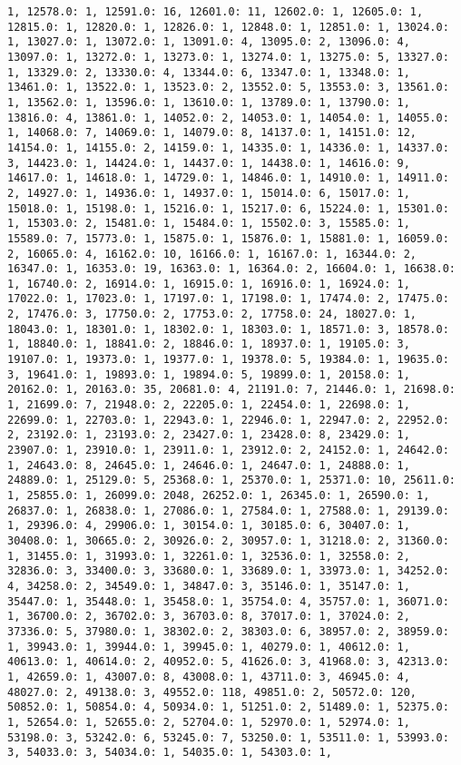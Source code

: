 \documentclass[11pt]{article}
\begin{document}
\begin{Verbatim}[commandchars=\\\{\}]
1, 12578.0: 1, 12591.0: 16, 12601.0: 11, 12602.0: 1, 12605.0: 1, 12815.0: 1, 12820.0: 1, 12826.0: 1, 12848.0: 1, 12851.0: 1, 13024.0: 1, 13027.0: 1, 13072.0: 1, 13091.0: 4, 13095.0: 2, 13096.0: 4, 13097.0: 1, 13272.0: 1, 13273.0: 1, 13274.0: 1, 13275.0: 5, 13327.0: 1, 13329.0: 2, 13330.0: 4, 13344.0: 6, 13347.0: 1, 13348.0: 1, 13461.0: 1, 13522.0: 1, 13523.0: 2, 13552.0: 5, 13553.0: 3, 13561.0: 1, 13562.0: 1, 13596.0: 1, 13610.0: 1, 13789.0: 1, 13790.0: 1, 13816.0: 4, 13861.0: 1, 14052.0: 2, 14053.0: 1, 14054.0: 1, 14055.0: 1, 14068.0: 7, 14069.0: 1, 14079.0: 8, 14137.0: 1, 14151.0: 12, 14154.0: 1, 14155.0: 2, 14159.0: 1, 14335.0: 1, 14336.0: 1, 14337.0: 3, 14423.0: 1, 14424.0: 1, 14437.0: 1, 14438.0: 1, 14616.0: 9, 14617.0: 1, 14618.0: 1, 14729.0: 1, 14846.0: 1, 14910.0: 1, 14911.0: 2, 14927.0: 1, 14936.0: 1, 14937.0: 1, 15014.0: 6, 15017.0: 1, 15018.0: 1, 15198.0: 1, 15216.0: 1, 15217.0: 6, 15224.0: 1, 15301.0: 1, 15303.0: 2, 15481.0: 1, 15484.0: 1, 15502.0: 3, 15585.0: 1, 15589.0: 7, 15773.0: 1, 15875.0: 1, 15876.0: 1, 15881.0: 1, 16059.0: 2, 16065.0: 4, 16162.0: 10, 16166.0: 1, 16167.0: 1, 16344.0: 2, 16347.0: 1, 16353.0: 19, 16363.0: 1, 16364.0: 2, 16604.0: 1, 16638.0: 1, 16740.0: 2, 16914.0: 1, 16915.0: 1, 16916.0: 1, 16924.0: 1, 17022.0: 1, 17023.0: 1, 17197.0: 1, 17198.0: 1, 17474.0: 2, 17475.0: 2, 17476.0: 3, 17750.0: 2, 17753.0: 2, 17758.0: 24, 18027.0: 1, 18043.0: 1, 18301.0: 1, 18302.0: 1, 18303.0: 1, 18571.0: 3, 18578.0: 1, 18840.0: 1, 18841.0: 2, 18846.0: 1, 18937.0: 1, 19105.0: 3, 19107.0: 1, 19373.0: 1, 19377.0: 1, 19378.0: 5, 19384.0: 1, 19635.0: 3, 19641.0: 1, 19893.0: 1, 19894.0: 5, 19899.0: 1, 20158.0: 1, 20162.0: 1, 20163.0: 35, 20681.0: 4, 21191.0: 7, 21446.0: 1, 21698.0: 1, 21699.0: 7, 21948.0: 2, 22205.0: 1, 22454.0: 1, 22698.0: 1, 22699.0: 1, 22703.0: 1, 22943.0: 1, 22946.0: 1, 22947.0: 2, 22952.0: 2, 23192.0: 1, 23193.0: 2, 23427.0: 1, 23428.0: 8, 23429.0: 1, 23907.0: 1, 23910.0: 1, 23911.0: 1, 23912.0: 2, 24152.0: 1, 24642.0: 1, 24643.0: 8, 24645.0: 1, 24646.0: 1, 24647.0: 1, 24888.0: 1, 24889.0: 1, 25129.0: 5, 25368.0: 1, 25370.0: 1, 25371.0: 10, 25611.0: 1, 25855.0: 1, 26099.0: 2048, 26252.0: 1, 26345.0: 1, 26590.0: 1, 26837.0: 1, 26838.0: 1, 27086.0: 1, 27584.0: 1, 27588.0: 1, 29139.0: 1, 29396.0: 4, 29906.0: 1, 30154.0: 1, 30185.0: 6, 30407.0: 1, 30408.0: 1, 30665.0: 2, 30926.0: 2, 30957.0: 1, 31218.0: 2, 31360.0: 1, 31455.0: 1, 31993.0: 1, 32261.0: 1, 32536.0: 1, 32558.0: 2, 32836.0: 3, 33400.0: 3, 33680.0: 1, 33689.0: 1, 33973.0: 1, 34252.0: 4, 34258.0: 2, 34549.0: 1, 34847.0: 3, 35146.0: 1, 35147.0: 1, 35447.0: 1, 35448.0: 1, 35458.0: 1, 35754.0: 4, 35757.0: 1, 36071.0: 1, 36700.0: 2, 36702.0: 3, 36703.0: 8, 37017.0: 1, 37024.0: 2, 37336.0: 5, 37980.0: 1, 38302.0: 2, 38303.0: 6, 38957.0: 2, 38959.0: 1, 39943.0: 1, 39944.0: 1, 39945.0: 1, 40279.0: 1, 40612.0: 1, 40613.0: 1, 40614.0: 2, 40952.0: 5, 41626.0: 3, 41968.0: 3, 42313.0: 1, 42659.0: 1, 43007.0: 8, 43008.0: 1, 43711.0: 3, 46945.0: 4, 48027.0: 2, 49138.0: 3, 49552.0: 118, 49851.0: 2, 50572.0: 120, 50852.0: 1, 50854.0: 4, 50934.0: 1, 51251.0: 2, 51489.0: 1, 52375.0: 1, 52654.0: 1, 52655.0: 2, 52704.0: 1, 52970.0: 1, 52974.0: 1, 53198.0: 3, 53242.0: 6, 53245.0: 7, 53250.0: 1, 53511.0: 1, 53993.0: 3, 54033.0: 3, 54034.0: 1, 54035.0: 1, 54303.0: 1, 
\end{Verbatim}
\end{document}

